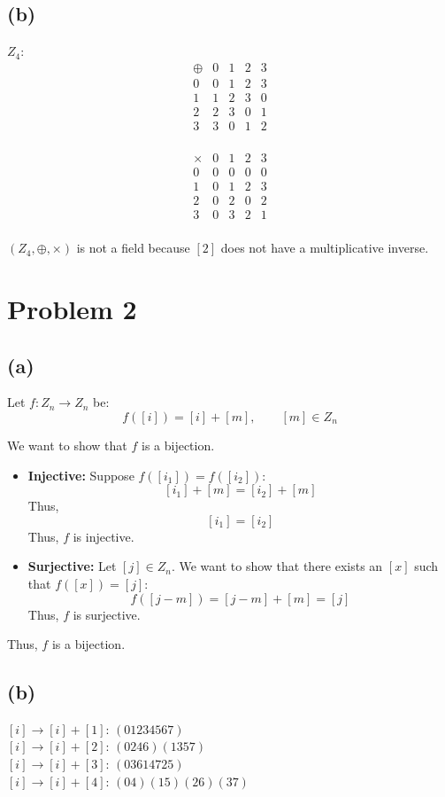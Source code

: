 \documentclass{article}
\begin{document}
\subsection*{(b)}
\(Z_4\):
\[
   \begin{array}{c|cccc}
   \oplus & 0 & 1 & 2 & 3 \\\hline
   0 & 0 & 1 & 2 & 3 \\
   1 & 1 & 2 & 3 & 0 \\
   2 & 2 & 3 & 0 & 1 \\
   3 & 3 & 0 & 1 & 2 \\
   \end{array}
\]

\[
\begin{array}{c|cccc}
\times & 0 & 1 & 2 & 3 \\\hline
0 & 0 & 0 & 0 & 0 \\
1 & 0 & 1 & 2 & 3 \\
2 & 0 & 2 & 0 & 2 \\
3 & 0 & 3 & 2 & 1 \\
\end{array}
\]

\((Z_4, \oplus, \times)\) is not a field because \([2]\) does not have a multiplicative inverse. \\

\section*{Problem 2}


\subsection*{(a)}

Let \(f: Z_n \to Z_n\) be:
\[
   f([i]) = [i] + [m], \qquad [m] \in Z_n
\]

We want to show that \(f\) is a bijection.
\begin{itemize}
   \item \textbf{Injective:} Suppose \(f([i_1]) = f([i_2])\):
   \[
      [i_1] + [m] = [i_2] + [m]
   \]
   Thus,
   \[
      [i_1] = [i_2]
   \]
   Thus, \(f\) is injective.
   \item \textbf{Surjective:} Let \([j] \in Z_n\). We want to show that there exists an \([x]\) such that \(f([x]) = [j]\):
   \[
      f([j - m]) = [j - m] + [m] = [j]
   \]
   Thus, \(f\) is surjective.
\end{itemize}
Thus, \(f\) is a bijection.

\subsection*{(b)}
\([i] \rightarrow [i] + [1]\):
\(
   (01234567)
\)
\\
\([i] \rightarrow [i] + [2]\):
\(
   (0246)(1357)
\)
\\
\([i] \rightarrow [i] + [3]\):
\(
   (03614725)
\)
\\
\([i] \rightarrow [i] + [4]\):
\(
   (04)(15)(26)(37)
\)
\end{document}
